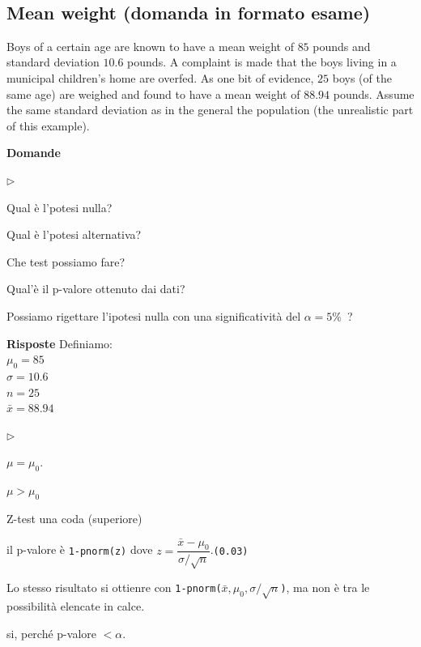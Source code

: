\documentclass[12pt,openany]{book}
\newcommand{\mylabel}[1]{{\footnotesize\textsf{#1}}\hfill}
\renewenvironment{itemize}
  {\begin{list}{$\triangleright$}{%
   \setlength{\parskip}{0mm}
   \setlength{\topsep}{.2\baselineskip}
   \setlength{\rightmargin}{0mm}
   \setlength{\listparindent}{0mm}
   \setlength{\itemindent}{0mm}
   \setlength{\labelwidth}{3ex}
   \setlength{\itemsep}{.4\baselineskip}
   \setlength{\parsep}{0mm}
   \setlength{\partopsep}{0mm}
   \setlength{\labelsep}{1ex}
   \setlength{\leftmargin}{\labelwidth+\labelsep}
   \let\makelabel\mylabel}}{%
   \end{list}\vspace*{-1.3mm}}
\theoremstyle{mio}
\theoremstyle{liscio}
\begin{document}
\hfill{}\clearpage\
\subsection{Mean weight (domanda in formato esame)}

Boys of a certain age are known to have a mean weight of $85$ pounds and standard deviation $10.6$ pounds. A complaint is made that the boys living in a municipal children's home are overfed. As one bit of evidence, $25$ boys (of the same age) are weighed and found to have a mean weight of $88.94$ pounds. Assume the same standard deviation as in the general the population (the unrealistic part of this example).


\textbf{Domande}

\begin{itemize}
\item[1.] Qual è l'potesi nulla?

\item[2.] Qual è l'potesi alternativa?

\item[3.] Che test possiamo fare?

\item[4.] Qual'è il p-valore ottenuto dai dati?

\item[5.] Possiamo rigettare l'ipotesi nulla con una significatività del $\alpha=5\%$~?
\end{itemize}

\textbf{Risposte} Definiamo:\\
$\mu_0=85$\\
$\sigma=10.6$\\
$n=25$\\
$\bar x=88.94$
\begin{itemize}
\item[1.] $\mu=\mu_0$.
\item[2.] $\mu>\mu_0$ 
\item[3.] Z-test una coda (superiore)
\item[4.] il p-valore è {\tt 1-pnorm(z)} dove $z=\dfrac{\bar x-\mu_0}{\sigma/\sqrt{n}}$.\hfill {\tt (0.03)}

Lo stesso risultato si ottienre con {\tt 1-pnorm($\bar x,\mu_0,\sigma/\sqrt{n}$)}, ma non è tra le possibilità elencate in calce.
\item[5.] si, perché  p-valore $<\alpha$.
\end{itemize}
\end{document}
